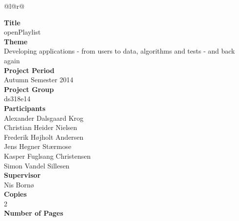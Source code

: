 
\begin{nopagebreak}
{\begin{center}
    \begin{tabular*}{\textwidth}{@{}l@{\extracolsep{\fill}}r@{}}
        \\
        \begin{minipage}[t]{0.49\textwidth}
            \textbf{Title}\\
            openPlaylist\\

            \textbf{Theme}\\
            Developing applications - from users to data, algorithms and tests - and back again\\

            \textbf{Project Period}\\
            Autumn Semester 2014\\

            \textbf{Project Group}\\
            ds318e14\\

            \textbf{Participants}\\
            Alexander Dalsgaard Krog\\
            Christian Heider Nielsen\\
            Frederik Højholt Andersen\\
            Jens Hegner Stærmose\\
            Kasper Fuglsang Christensen\\
            Simon Vandel Sillesen\\

            \textbf{Supervisor}\\
            Nis Bornø\\

            \textbf{Copies}\\
            2\\ %

            \textbf{Number of Pages}\\
            \pageref{LastPage}\\ 


\end{minipage}
\end{tabular*}
\end{center}}
\end{nopagebreak}
